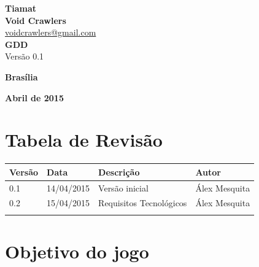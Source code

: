 \documentclass[11pt]{article} %
\begin{document}
\begin{titlepage}
 \vfill
  \begin{center}
   {\large \textbf{Tiamat}} \\
   {\large \textbf{Void Crawlers}}\\
   {\large \href{mailto:voidcrawlers@gmail.com}{voidcrawlers@gmail.com}}\\[6cm]


   {\Large \textbf{GDD}}\\
   {\Large Versão 0.1}\\[6cm]

   \hspace{.45\textwidth} %
  \vfill

\vspace{2cm}

\large \textbf{Brasília}

\large \textbf{Abril de 2015}
\end{center}
\end{titlepage}
\newpage

\tableofcontents

\newpage


\section{Tabela de Revisão}


\begin{table}[h]
\begin{tabular}{|l|l|p{60mm}|l|}

\hline
\textbf{Versão}  	& \textbf{Data} 	& \textbf{Descrição} 								& \textbf{Autor} 	\\ \hline
0.1               	& 14/04/2015        & Versão inicial              						& Álex Mesquita 	\\ \hline
0.2			      	& 15/04/2015       	& Requisitos Tecnológicos							& Álex Mesquita		\\ \hline
			      	& 	 	          	&           										&  					\\ \hline
\end{tabular}
\end{table}

\newpage

\section{Objetivo do jogo}
\end{document}
